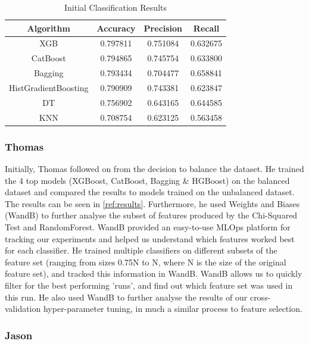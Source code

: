 \documentclass[conference]{IEEEtran}
\begin{document}
\begin{table}[h]
  \centering
  \caption{Initial Classification Results}
  \label{tab:initial-clf-results}
  \begin{tabular}{|c|c|c|c|}
    \hline
    \textbf{Algorithm} & \textbf{Accuracy} & \textbf{Precision} & \textbf{Recall} \\ \hline
    XGB	& 0.797811 & 0.751084 & 0.632675 \\
    \hline
    CatBoost & 0.794865 & 0.745754 & 0.633800 \\
    \hline
    Bagging & 0.793434 & 0.704477 & 0.658841 \\
    \hline
    HistGradientBoosting & 0.790909 & 0.743381 & 0.623847 \\
    \hline
    DT & 0.756902 & 0.643165 & 0.644585 \\
    \hline
    KNN & 0.708754 & 0.623125 & 0.563458 \\
    \hline
  \end{tabular}
\end{table}


\subsubsection{Thomas}

Initially, Thomas followed on from the decision to balance the dataset. He trained the 4 top models (XGBoost, CatBoost, Bagging \& HGBoost) on the balanced dataset and compared the results to models trained on the unbalanced dataset. The results can be seen in \ref{ref:results}. Furthermore, he used Weights and Biases (WandB) \cite{wandb} to further analyse the subset of features produced by the Chi-Squared Test and RandomForest.  WandB provided an easy-to-use MLOps platform for tracking our experiments and helped us understand which features worked best for each classifier. He trained multiple classifiers on different subsets of the feature set (ranging from sizes 0.75N to N, where N is the size of the original feature set), and tracked this information in WandB. WandB allows us to quickly filter for the best performing 'runs', and find out which feature set was used in this run. He also used WandB to further analyse the results of our cross-validation hyper-parameter tuning, in much a similar process to feature selection.

\subsubsection{Jason}
\end{document}
